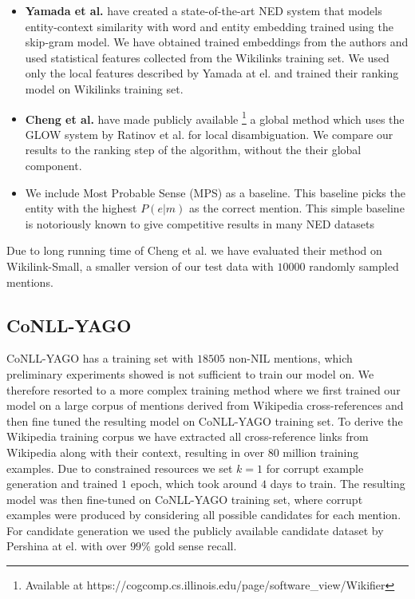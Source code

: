 \documentclass[11pt]{article}
\begin{document}
\begin{itemize} 
	\item  \textbf{Yamada et al.}  have created a state-of-the-art NED system that models entity-context similarity with word and entity embedding trained using the skip-gram model. We have obtained trained embeddings from the authors and used statistical features collected from the Wikilinks training set. We used only the local features described by Yamada at el. and trained their ranking model on Wikilinks training set.
	
	\item \textbf{Cheng et al.}  have made publicly available \footnote{Available at https://cogcomp.cs.illinois.edu/page/software\_view/Wikifier } a global method which uses the GLOW system by Ratinov et al.  for local disambiguation. We compare our results to the ranking step of the algorithm, without the their global component.
	
	\item We include Most Probable Sense (MPS) as a baseline. This baseline picks the entity with the highest $P(e|m)$ as the correct mention. This simple baseline is notoriously known to give competitive results in many NED datasets 
\end{itemize}

Due to long running time of Cheng et al. we have evaluated their method on Wikilink-Small, a smaller version of our test data with $10000$ randomly sampled mentions.

\subsection{CoNLL-YAGO}

CoNLL-YAGO has a training set with $18505$ non-NIL mentions, which preliminary experiments showed is not sufficient to train our model on. We therefore resorted to a more complex training method where we first trained our model on a large corpus of mentions derived from Wikipedia cross-references and then fine tuned the resulting model on CoNLL-YAGO training set. To derive the Wikipedia training corpus we have extracted all cross-reference links from Wikipedia along with their context, resulting in over $80$ million training examples. Due to constrained resources we set $k=1$ for corrupt example generation and trained $1$ epoch, which took around $4$ days to train. The resulting model was then fine-tuned on CoNLL-YAGO training set, where corrupt examples were produced by considering all possible candidates for each mention.
For candidate generation we used the publicly available candidate dataset by Pershina at el.  with over $99\%$ gold sense recall.
\end{document}
